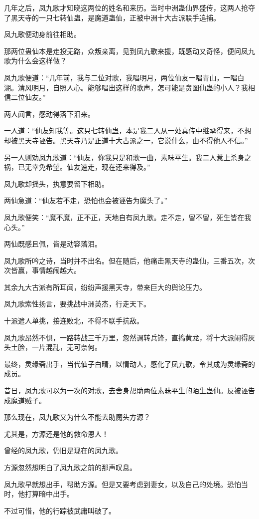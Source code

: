 \begin{this_body}
几年之后，凤九歌才知晓这两位的姓名和来历。当时中洲蛊仙界盛传，这两人抢夺了黑天寺的一只七转仙蛊，是魔道蛊仙，正被中洲十大古派联手追捕。

凤九歌便动身前往相助。

那两位蛊仙本是走投无路，众叛亲离，见到凤九歌来援，既感动又奇怪，便问凤九歌为什么会这样做？

凤九歌便道：“几年前，我与二位对歌，我唱明月，两位仙友一唱青山，一唱白湖。清风明月，自照人心。能够唱出这样的歌声，怎可能是贪图仙蛊的小人？我相信二位仙友。”

两人闻言，感动得落下泪来。

一人道：“仙友知我等。这只七转仙蛊，本是我二人从一处真传中继承得来，不想却被黑天寺诬告。黑天寺乃是正道十大古派之一，它说什么，由不得他人不信。”

另一人则劝凤九歌道：“仙友，你我只是和歌一曲，素味平生。我二人惹上杀身之祸，已无幸免希望。仙友速走，现在还来得及。”

凤九歌却摇头，执意要留下相助。

两仙急道：“仙友若不走，恐怕也会被诬告为魔头了。”

凤九歌便笑：“魔不魔，正不正，天地自有凤九歌。走不走，留不留，死生皆在我心头。”

两仙既感且佩，皆是动容落泪。

凤九歌所吟之诗，当时并不出名。但在随后，他痛击黑天寺的蛊仙，三番五次，次次皆赢，事情越闹越大。

其余九大古派有所耳闻，纷纷声援黑天寺，带来巨大的舆论压力。

凤九歌索性扬言，要挑战中洲英杰，行走天下。

十派遣人单挑，接连败北，不得不联手抗敌。

凤九歌昂然不惧，一路转战三千万里，忽然调转兵锋，直捣黄龙，将十大派闹得灰头土脸，一片混乱，无可奈何。

最终，灵缘斋出手，当代仙子白晴，以情动人，感化了凤九歌，令其成为灵缘斋的成员。

昔日，凤九歌可以为一次的对歌，去舍身帮助两位素昧平生的陌生蛊仙。反被诬告成魔道贼子。

那么现在，凤九歌又为什么不能去助魔头方源？

尤其是，方源还是他的救命恩人！

曾经的凤九歌，仍旧是现在的凤九歌。

方源忽然想明白了凤九歌之前的那声叹息。

凤九歌早就想出手，帮助方源。但是又要考虑到妻女，以及自己的处境。恐怕当时，他打算暗中出手。

不过可惜，他的行踪被武庸叫破了。


\end{this_body}
